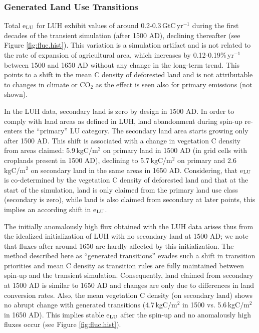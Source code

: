 \subsubsection*{Generated Land Use Transitions}
\label{generated}
Total e$_{\mbox{\scriptsize LU}}$ for LUH exhibit values of around 0.2-0.3\,GtC\,yr$^{-1}$ during the first decades of the transient simulation (after 1500 AD), declining thereafter (see Figure \ref{fig:fluc.hist}). This variation is a simulation artifact and is not related to the rate of expansion of agricultural area, which increases by 0.12-0.19\%\,yr$^{-1}$ between 1500 and 1650 AD without any change in the long-term trend. This points to a shift in the mean C density of deforested land and is not attributable to changes in climate or CO$_2$ as the effect is seen also for primary emissions (not shown). 

In the LUH data, secondary land is zero by design in 1500 AD. In order to comply with land areas as defined in LUH, land abandonment during spin-up re-enters the ``primary'' LU category. The secondary land area starts growing only after 1500 AD. This shift is associated with a change in vegetation C density from areas claimed: 5.9\,kgC/m$^2$ on primary land in 1500 AD (in grid cells with croplands present in 1500 AD), declining to 5.7\,kgC/m$^2$ on primary and 2.6\,kgC/m$^2$ on secondary land in the same areas in 1650 AD. Considering, that e$_{\mbox{\scriptsize LU}}$ is co-determined by the vegetation C density of deforested land and that at the start of the simulation, land is only claimed from the primary land use class (secondary is zero), while land is also claimed from secondary at later points, this implies an according shift in e$_{\mbox{\scriptsize LU}}$. 

The initially anomalously high flux obtained with the LUH data arises thus from the idealized initialization of LUH with no secondary land at 1500 AD; we note that fluxes after around 1650 are hardly affected by this initialization. The method described here as ``generated transitions'' evades such a shift in transition priorities and mean C density as transition rules are fully maintained between spin-up and the transient simulation. Consequently, land claimed from secondary at 1500 AD is similar to 1650 AD and changes are only due to differences in land conversion rates. Also, the mean vegetation C density (on secondary land) shows no abrupt change with generated transitions (4.7\,kgC/m$^2$ in 1500 vs. 5.6\,kgC/m$^2$ in 1650 AD). This implies stable e$_{\mbox{\scriptsize LU}}$ after the spin-up and no anomalously high fluxes occur (see Figure \ref{fig:fluc.hist}). 


